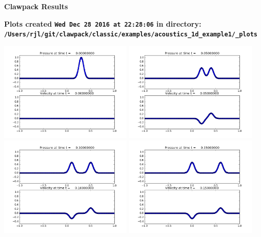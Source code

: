 \documentclass[11pt]{article}
\begin{document}
        \begin{center}{\Large\bf Clawpack Results}\vskip 5pt
        
        \bf Plots created {\tt Wed Dec 28 2016 at 22:28:06} in directory: \vskip 5pt
        \verb+/Users/rjl/git/clawpack/classic/examples/acoustics_1d_example1/_plots+
        \end{center}
        \vskip 5pt
        \includegraphics[width=0.475\textwidth]{frame0000fig1.png}
\vskip 10pt 
\includegraphics[width=0.475\textwidth]{frame0001fig1.png}
\vskip 10pt 
\includegraphics[width=0.475\textwidth]{frame0002fig1.png}
\vskip 10pt 
\includegraphics[width=0.475\textwidth]{frame0003fig1.png}
\end{document}

